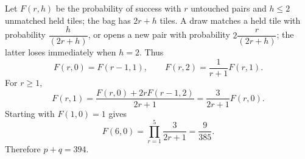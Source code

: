 Let $F(r,h)$ be the probability of success with $r$ untouched pairs and $h\le2$ unmatched held tiles; the bag has $2r+h$ tiles. A draw matches a held tile with probability $\dfrac{h}{(2r+h)}$, or opens a new pair with probability $2\dfrac{r}{(2r+h)}$; the latter loses immediately when $h=2$. Thus
\[
F(r,0)=F(r-1,1),\qquad F(r,2)=\dfrac{1}{r+1}F(r,1).
\]
For $r\ge1$,
\[
F(r,1)=\dfrac{F(r,0)+2rF(r-1,2)}{2r+1}
=\dfrac{3}{2r+1}F(r,0).
\]
Starting with $F(1,0)=1$ gives
\[
F(6,0)=\prod_{r=1}^{5}\dfrac{3}{2r+1}=\dfrac{9}{385}.
\]
Therefore $\boxed{p+q=394}$.
